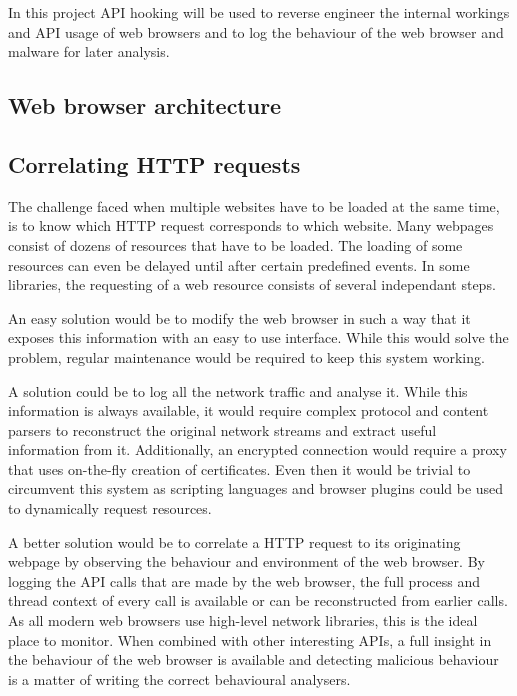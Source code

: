 In this project API hooking will be used to reverse engineer the internal workings and API usage of web browsers and to log the behaviour of the web browser and malware for later analysis.

\subsection{Web browser architecture}


\subsection{Correlating HTTP requests}

The challenge faced when multiple websites have to be loaded at the same time, is to know which HTTP request corresponds to which website. Many webpages consist of dozens of resources that have to be loaded. The loading of some resources can even be delayed until after certain predefined events. In some libraries, the requesting of a web resource consists of several independant steps.

An easy solution would be to modify the web browser in such a way that it exposes this information with an easy to use interface. While this would solve the problem, regular maintenance would be required to keep this system working. 

A solution could be to log all the network traffic and analyse it. While this information is always available, it would require complex protocol and content parsers to reconstruct the original network streams and extract useful information from it. Additionally, an encrypted connection would require a proxy that uses on-the-fly creation of certificates. Even then it would be trivial to circumvent this system as scripting languages and browser plugins could be used to dynamically request resources.

A better solution would be to correlate a HTTP request to its originating webpage by observing the behaviour and environment of the web browser. By logging the API calls that are made by the web browser, the full process and thread context of every call is available or can be reconstructed from earlier calls. As all modern web browsers use high-level network libraries, this is the ideal place to monitor. When combined with other interesting APIs, a full insight in the behaviour of the web browser is available and detecting malicious behaviour is a matter of writing the correct behavioural analysers.
